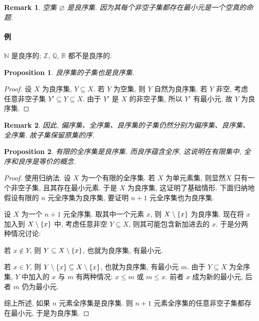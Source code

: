 \documentclass[UTF8]{ctexart}
\theoremstyle{mystyle}
\newtheorem{proposition}{Proposition}[section]
\theoremstyle{myremark}
\newtheorem*{remark}{Remark}
\theoremstyle{plain}
\newcommand{\R}{\mathbb R}
\newcommand{\Z}{\mathbb Z}
\newcommand{\N}{\mathbb N}
\newcommand{\Q}{\mathbb Q}
\DeclarePairedDelimiter\set{\{}{\}}
\begin{document}
\begin{remark}
    空集 $ \varnothing $ 是良序集. 因为其每个非空子集都存在最小元是一个空真的命题.
\end{remark}


\paragraph{例}
$ \N $ 是良序的; $ \Z $, $ \Q $, $ \R $ 都不是良序的.

\begin{proposition}
    良序集的子集也是良序集.
\end{proposition}

\begin{proof}
    设 $ X $ 为良序集, $ Y \subseteq X $. 若 $ Y $ 为空集, 则 $ Y $ 自然为良序集. 若 $ Y $ 非空, 考虑任意非空子集 $ Y' \subseteq Y \subseteq X $. 由于 $ Y' $ 是 $ X $ 的非空子集, 所以 $ Y' $ 有最小元. 故 $ Y $ 为良序集.
\end{proof}

\begin{remark}
    因此, 偏序集、全序集、良序集的子集仍然分别为偏序集、良序集、全序集. 故子集保留原集的序.
\end{remark}

\begin{proposition}
    有限的全序集是良序集. 而良序蕴含全序, 这说明在有限集中, 全序和良序是等价的概念.
\end{proposition}

\begin{proof}
    使用归纳法. 设 $ X $ 为一个有限的全序集. 若 $ X $ 为单元素集, 则显然$ X $ 只有一个非空子集, 且其存在最小元素. 于是 $ X $ 为良序集, 这证明了基础情形. 下面归纳地假设有限的 $ n $ 元全序集为良序集, 要证明 $ n + 1 $ 元全序集也为良序集. 
    
    设 $ X $ 为一个 $ n + 1 $ 元全序集. 取其中一个元素 $ x $, 则 $ X \setminus \set{x} $ 为良序集. 现在将 $ x $ 加入到 $ X \setminus \set{x} $ 中, 考虑任意非空 $ Y \subseteq X $, 则其可能包含新加进去的 $ x $. 于是分两种情况讨论: 
    
    若 $ x \notin Y $, 则 $ Y \subseteq X \setminus \set{x} $, 也就为良序集, 有最小元.
    
    若 $ x \in Y $, 则 $ Y \setminus \set{x} \subseteq X \setminus \set{x} $, 也就为良序集, 有最小元 $ m $. 由于 $ Y \subseteq X $ 为全序集, $ Y $ 中加入的 $ x $ 与 $ m $ 有两种情况: $ x \le m $ 或 $ m \le x $. 前者 $ x $ 成为新的最小元, 后者 $ m $ 仍为最小元. 

    综上所述, 如果 $ n $ 元素全序集是良序集. 则 $ n + 1 $ 元素全序集的任意非空子集都存在最小元, 于是为良序集.
\end{proof}
\end{document}
